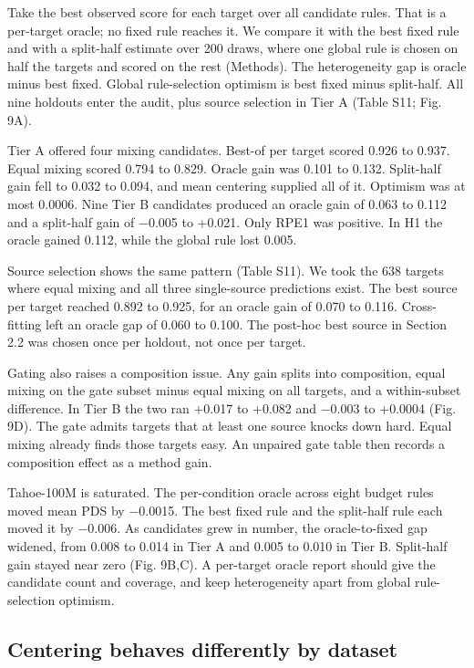 \documentclass[12pt]{article}
\begin{document}
Take the best observed score for each target over all candidate rules. That is a per-target oracle; no fixed rule reaches it. We compare it with the best fixed rule and with a split-half estimate over 200 draws, where one global rule is chosen on half the targets and scored on the rest (Methods). The heterogeneity gap is oracle minus best fixed. Global rule-selection optimism is best fixed minus split-half. All nine holdouts enter the audit, plus source selection in Tier A (Table S11; Fig. 9A).

Tier A offered four mixing candidates. Best-of per target scored 0.926 to 0.937. Equal mixing scored 0.794 to 0.829. Oracle gain was 0.101 to 0.132. Split-half gain fell to 0.032 to 0.094, and mean centering supplied all of it. Optimism was at most 0.0006. Nine Tier B candidates produced an oracle gain of 0.063 to 0.112 and a split-half gain of $-$0.005 to +0.021. Only RPE1 was positive. In H1 the oracle gained 0.112, while the global rule lost 0.005.

Source selection shows the same pattern (Table S11). We took the 638 targets where equal mixing and all three single-source predictions exist. The best source per target reached 0.892 to 0.925, for an oracle gain of 0.070 to 0.116. Cross-fitting left an oracle gap of 0.060 to 0.100. The post-hoc best source in Section 2.2 was chosen once per holdout, not once per target.

Gating also raises a composition issue. Any gain splits into composition, equal mixing on the gate subset minus equal mixing on all targets, and a within-subset difference. In Tier B the two ran +0.017 to +0.082 and $-$0.003 to +0.0004 (Fig. 9D). The gate admits targets that at least one source knocks down hard. Equal mixing already finds those targets easy. An unpaired gate table then records a composition effect as a method gain.

Tahoe-100M is saturated. The per-condition oracle across eight budget rules moved mean PDS by $-$0.0015. The best fixed rule and the split-half rule each moved it by $-$0.006. As candidates grew in number, the oracle-to-fixed gap widened, from 0.008 to 0.014 in Tier A and 0.005 to 0.010 in Tier B. Split-half gain stayed near zero (Fig. 9B,C). A per-target oracle report should give the candidate count and coverage, and keep heterogeneity apart from global rule-selection optimism.

\subsection{Centering behaves differently by dataset}
\end{document}
